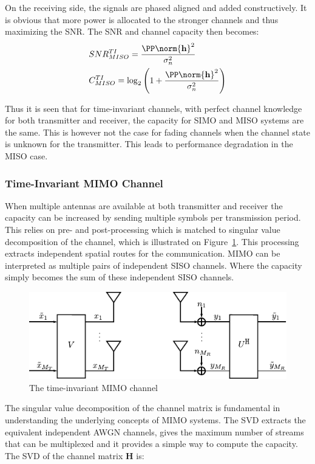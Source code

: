 On the receiving side, the signals are phased aligned and added constructively. It is obvious that more power is allocated to the stronger channels and thus maximizing the SNR. The SNR and channel capacity then becomes\cite{Tim2012Practical}:
\begin{align*}
&SNR^{TI}_{MISO} = \frac{\PP \norm{\mathbf{h}}^2}{\sigma^2_n} \\
&C^{TI}_{MISO} = \log_2 \left( 1+\frac{\PP \norm{\mathbf{h}}^2}{\sigma^2_n} \right)  
\end{align*}

Thus it is seen that for time-invariant channels, with perfect channel knowledge for both transmitter and receiver, the capacity for SIMO and MISO systems are the same. This is however not the case for fading channels when the channel state is unknown for the transmitter. This leads to performance degradation in the MISO case\cite{Tim2012Practical}. 

\subsubsection{Time-Invariant MIMO Channel}
When multiple antennas are available at both transmitter and receiver the capacity can be increased by sending multiple symbols per transmission period. This relies on pre- and post-processing which is matched to singular value decomposition of the channel\cite{Tim2012Practical}, which is illustrated on Figure~\ref{fig:mimoModel}. This processing extracts independent spatial routes for the communication. MIMO can be interpreted as multiple pairs of independent SISO channels. Where the capacity simply becomes the sum of these independent SISO channels.\cite{Tim2012Practical} 
\begin{figure}[htbp]
  \centering
  \includegraphics[scale=1.2]{img/analysis/mimoModel}
  \caption{The time-invariant MIMO channel}
  \label{fig:mimoModel}
\end{figure}
The singular value decomposition of the channel matrix is fundamental in understanding the underlying concepts of MIMO systems. The SVD extracts the equivalent independent AWGN channels, gives the maximum number of streams that can be multiplexed and it provides a simple way to compute the capacity. The SVD of the channel matrix $\mathbf{H}$ is\cite{Tim2012Practical}: 

